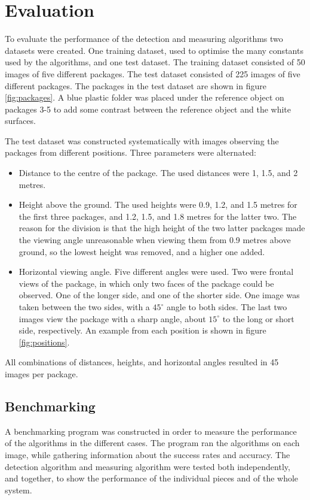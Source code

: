 \section{Evaluation} %
To evaluate the performance of the detection and measuring algorithms two datasets were created.
One training dataset, used to optimise the many constants used by the algorithms, and one test dataset. %
The training dataset consisted of 50 images of five different packages.
The test dataset consisted of 225 images of five different packages.
The packages in the test dataset are shown in figure \ref{fig:packages}. A blue plastic folder was placed under the reference object on packages 3-5 to  add some contrast between the reference object and the white surfaces.



The test dataset was constructed systematically with images observing the packages from different positions.
Three parameters were alternated: 
\begin{itemize}
	\item Distance to the centre of the package. 
			The used distances were 1, 1.5, and 2 metres.
	\item Height above the ground. 
			The used heights were 0.9, 1.2, and 1.5 metres for the first three packages, and 1.2, 1.5, and 1.8 metres for the latter two.
			The reason for the division is that the high height of the two latter packages made the viewing angle unreasonable when viewing them from 0.9 metres above ground, so the lowest height was removed, and a higher one added.
	\item Horizontal viewing angle. 
			Five different angles were used.
			Two were frontal views of the package, in which only two faces of the package could be observed. One of the longer side, and one of the shorter side.
			One image was taken between the two sides, with a $45^\circ$ angle to both sides.
			The last two images view the package with a sharp angle, about $15^\circ$ to the long or short side, respectively.
			An example from each position is shown in figure \ref{fig:positions}.
\end{itemize}



All combinations of distances, heights, and horizontal angles resulted in 45 images per package.

\subsection{Benchmarking} \label{benchmarking}
A benchmarking program was constructed in order to measure the performance of the algorithms in the different cases.
The program ran the algorithms on each image, while gathering information about the success rates and accuracy.
The detection algorithm and measuring algorithm were tested both independently, and together, to show the performance of the individual pieces and of the whole system. 

